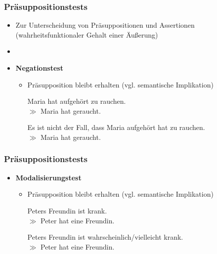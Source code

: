 
\begin{frame}
\frametitle{Präsuppositionstests}

\begin{itemize}
	\item Zur Unterscheidung von Präsuppositionen und Assertionen (wahrheitsfunktionaler Gehalt einer Äu\ss{}erung)
	\item[]
	\item \textbf{Negationstest}
	
	\begin{itemize}
		\item Präsupposition bleibt erhalten (vgl. semantische Implikation)		
		
		\ea Maria hat aufgehört zu rauchen.\\ $\gg$ Maria hat geraucht.
		\z
		
		\ea Es ist nicht der Fall, dass Maria aufgehört hat zu rauchen.\\ $\gg$ Maria hat geraucht.
		\z
		
	\end{itemize}	

\end{itemize}	



\end{frame}



\begin{frame}
\frametitle{Präsuppositionstests}

\begin{itemize}
	\item \textbf{Modalisierungstest}
	
	\begin{itemize}
		\item Präsupposition bleibt erhalten (vgl. semantische Implikation)

		\ea Peters Freundin ist krank.\\ $\gg$ Peter hat eine Freundin.
		\z
		
		\ea Peters Freundin ist wahrscheinlich/vielleicht krank.\\ $\gg$ Peter hat eine Freundin.
		\z
	
	\end{itemize}
	
\end{itemize}

\end{frame}


